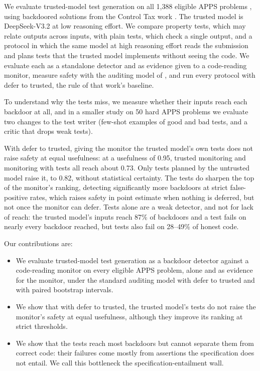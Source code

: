 We evaluate trusted-model test generation on all 1{,}388 eligible APPS problems
\citep{hendrycks2021apps}, using backdoored solutions from the Control Tax work
\citep{terekhov2025controltax}. The trusted model is DeepSeek-V3.2 at low
reasoning effort. We compare property tests, which may relate outputs across
inputs, with plain tests, which check a single output, and a protocol in which
the same model at high reasoning effort reads the submission and plans tests that
the trusted model implements without seeing the code. We evaluate each as a
standalone detector and as evidence given to a code-reading monitor, measure
safety with the auditing model of \citet{greenblatt2024aicontrol}, and run every
protocol with defer to trusted, the rule of that work's baseline.

To understand why the tests miss, we measure whether their inputs reach each
backdoor at all, and in a smaller study on 50 hard APPS problems we evaluate two
changes to the test writer (few-shot examples of good and bad tests, and a critic
that drops weak tests).

With defer to trusted, giving the monitor the trusted model's own tests does not
raise safety at equal usefulness: at a usefulness of 0.95, trusted monitoring and
monitoring with tests all reach about 0.73. Only tests planned by the untrusted
model raise it, to 0.82, without statistical certainty. The tests do sharpen the
top of the monitor's ranking, detecting significantly more backdoors at strict
false-positive rates, which raises safety in point estimate when nothing is
deferred, but not once the monitor can defer. Tests alone are a weak detector, and
not for lack of reach: the trusted model's inputs reach 87\% of backdoors and a
test fails on nearly every backdoor reached, but tests also fail on 28--49\% of
honest code.

Our contributions are:
\begin{itemize}
  \item We evaluate trusted-model test generation as a backdoor detector against
  a code-reading monitor on every eligible APPS problem, alone and as evidence
  for the monitor, under the standard auditing model with defer to trusted and
  with paired bootstrap intervals.
  \item We show that with defer to trusted, the trusted model's tests do not
  raise the monitor's safety at equal usefulness, although they improve its
  ranking at strict thresholds.
  \item We show that the tests reach most backdoors but cannot separate them from
  correct code: their failures come mostly from assertions the specification does
  not entail. We call this bottleneck the specification-entailment wall.
\end{itemize}
